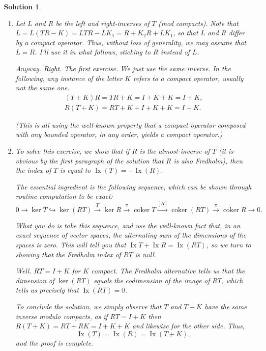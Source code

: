 \documentclass{article}
\theoremstyle{nonumberplain}
\newtheorem{sol}{Solution}
\DeclareMathOperator{\Ix}{Ix}
\DeclareMathOperator{\coker}{coker}
\begin{document}
\begin{sol}
\leavevmode
\begin{enumerate}
\item Let $L$ and $R$ be the left and right-inverses of $T$ (mod compacts). Note that $L = L(TR - K) = LTR - LK_1 = R + K_2 R + L K_1$, so that $L$ and $R$ differ by a compact operator. Thus, without loss of generality, we may assume that $L = R$. I'll use it in what follows, sticking to $R$ instead of $L$.

Anyway. Right. The first exercise. We just use the same inverse. In the following, any instance of the letter $K$ refers to a compact operator, usually not the same one.
\begin{equation}
\begin{gathered}
(T+K)R = TR + K = I + K + K = I + K,\\
R(T+K) = RT + K + I + K + K = I + K.
\end{gathered}
\end{equation}

(This is all using the well-known property that a compact operator composed with any bounded operator, in any order, yields a compact operator.)

\item To solve this exercise, we show that if $R$ is the almost-inverse of $T$ (it is obvious by the first paragraph of the solution that $R$ is also Fredholm), then the index of $T$ is equal to $\Ix(T) = - \Ix(R)$.

The essential ingredient is the following sequence, which can be shown through routine computation to be exact:
\begin{equation}
0 \to \ker T \hookrightarrow \ker(RT) \xrightarrow{T} \ker R \xrightarrow\pi \coker T \xrightarrow{[R]} \coker(RT) \xrightarrow\pi \coker R \to 0.
\end{equation}

What you do is take this sequence, and use the well-known fact that, in an exact sequence of vector spaces, the alternating sum of the dimensions of the spaces is zero. This will tell you that $\Ix T + \Ix R = \Ix(RT)$, so we turn to showing that the Fredholm index of $RT$ is null.

Well. $RT = I + K$ for $K$ compact. The Fredholm alternative tells us that the dimension of $\ker(RT)$ equals the codimension of the image of $RT$, which tells us precisely that $\Ix(RT) = 0$.

To conclude the solution, we simply observe that $T$ and $T+K$ have the same inverse modulo compacts, as if $RT = I+K$ then $R(T+K) = RT + RK = I + K + K$ and likewise for the other side. Thus,
\begin{equation}
\Ix(T) = \Ix(R) = \Ix(T+K),
\end{equation}
and the proof is complete.




\end{enumerate}
\end{sol}
\end{document}
